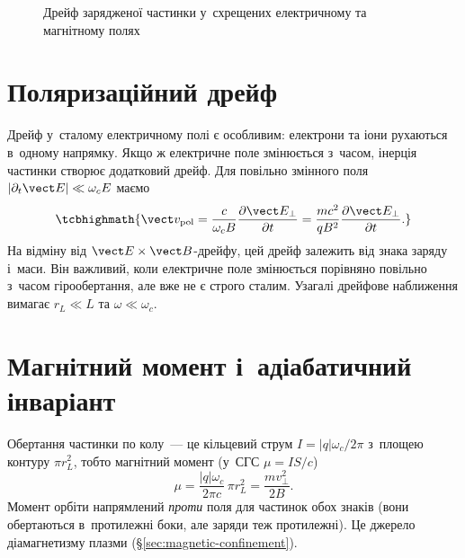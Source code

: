 \begin{figure}[h!]\centering
	\caption{Дрейф зарядженої частинки у~схрещених електричному та магнітному полях}
	\label{pic:ExB-drift}
\end{figure}



\section{Поляризаційний дрейф}



Дрейф у~сталому електричному полі є особливим: електрони та іони рухаються в~одному
напрямку. Якщо ж електричне поле змінюється з~часом, інерція частинки створює додатковий
дрейф. Для повільно змінного поля $|\partial_t\vect E|\ll\omega_c E$ маємо
\begin{equation}\label{eq:polarization-drift}
 \tcbhighmath{
 \vect v_{\mathrm{pol}}
 =\frac{c}{\omega_c B}\frac{\partial\vect E_\perp}{\partial t}
 =\frac{mc^2}{qB^2}\frac{\partial\vect E_\perp}{\partial t}.
 }
\end{equation}
На відміну від $\vect E\times\vect B$-дрейфу, цей дрейф залежить від знака заряду і~маси.
Він важливий, коли електричне поле змінюється порівняно повільно з~часом гірообертання,
але вже не є строго сталим. Узагалі дрейфове наближення вимагає $r_L\ll L$ та
$\omega\ll\omega_c$.



\section{Магнітний момент і~адіабатичний інваріант}



Обертання частинки по колу~--- це кільцевий струм $I=|q|\omega_c/2\pi$ з~площею контуру
$\pi r_L^2$, тобто магнітний момент (у~СГС $\mu=IS/c$)
\begin{equation}\label{eq:mu}
	\mu=\frac{|q|\omega_c}{2\pi c}\,\pi r_L^2=\frac{mv_\perp^2}{2B}.
\end{equation}
Момент орбіти напрямлений \emph{проти} поля для частинок обох знаків (вони обертаються
в~протилежні боки, але заряди теж протилежні). Це джерело діамагнетизму плазми
(§\ref{sec:magnetic-confinement}).


